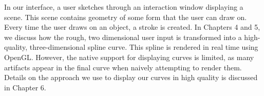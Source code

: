 \documentclass[11pt]{report}
\begin{document}
In our interface, a user sketches through an interaction window displaying a scene.
This scene contains geometry of some form that the user can draw on.
Every time the user draws on an object, a stroke is created.
In Chapters 4 and 5, we discuss how the rough, two dimensional user input is transformed into a high-quality, three-dimensional spline curve.
This spline is rendered in real time using OpenGL.
However, the native support for displaying curves is limited, as many artifacts appear in the final curve when naively attempting to render them.
Details on the approach we use to display our curves in high quality is discussed in Chapter 6.
\end{document}
